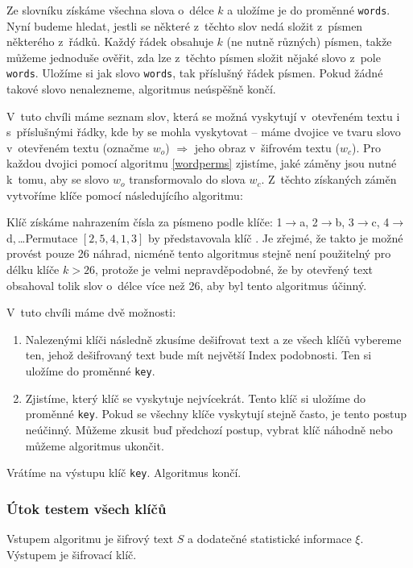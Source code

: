 \documentclass[12pt]{article}
\theoremstyle{definition}
\newcommand{\var}[1]{\texttt{#1}}
\newcommand{\stats}{\xi}
\begin{document}
Ze slovníku získáme všechna slova o~délce $k$ a uložíme je do proměnné \var{words}. Nyní budeme hledat, jestli se některé z~těchto slov nedá složit z~písmen některého z~řádků. Každý řádek obsahuje $k$ (ne nutně různých) písmen, takže můžeme jednoduše ověřit, zda lze z~těchto písmen složit nějaké slovo z~pole \var{words}. Uložíme si jak slovo \var{words}, tak příslušný řádek písmen. Pokud žádné takové slovo nenalezneme, algoritmus neúspěšně končí. 

V~tuto chvíli máme seznam slov, která se možná vyskytují v~otevřeném textu i s~příslušnými řádky, kde by se mohla vyskytovat -- máme dvojice ve tvaru slovo v~otevřeném textu (označme $w_o$) $\Rightarrow$ jeho obraz v~šifrovém textu ($w_c$). Pro každou dvojici pomocí algoritmu \ref{wordperms} zjistíme, jaké záměny jsou nutné k~tomu, aby se slovo $w_o$ transformovalo do slova $w_c$. Z~těchto získaných záměn vytvoříme klíče pomocí následujícího algoritmu: 

Klíč získáme nahrazením čísla za písmeno podle klíče: 1$\rightarrow$a, 2$\rightarrow$b, 3$\rightarrow$c, 4$\rightarrow$d,\,\dots Permutace $\left[2,5,4,1,3\right]$ by představovala klíč . Je zřejmé, že takto je možné provést pouze 26 náhrad, nicméně tento algoritmus stejně není použitelný pro délku klíče $k>26$, protože je velmi nepravděpodobné, že by otevřený text obsahoval tolik slov o~délce více než 26, aby byl tento algoritmus účinný.

V~tuto chvíli máme dvě možnosti:

\begin{enumerate}
\item Nalezenými klíči následně zkusíme dešifrovat text a ze všech klíčů vybereme ten, jehož dešifrovaný text bude mít největší Index podobnosti. Ten si uložíme do proměnné \var{key}.
\item Zjistíme, který klíč se vyskytuje nejvícekrát. Tento klíč si uložíme do proměnné \var{key}. Pokud se všechny klíče vyskytují stejně často, je tento postup neúčinný. Můžeme zkusit buď předchozí postup, vybrat klíč náhodně nebo můžeme algoritmus ukončit. 
\end{enumerate}

Vrátíme na výstupu klíč \var{key}. Algoritmus končí. 

\subsubsection{Útok testem všech klíčů}
\label{testkeylengthtransattack}
Vstupem algoritmu je šifrový text $S$ a dodatečné statistické informace $\stats$. Výstupem je šifrovací klíč. 
\end{document}
